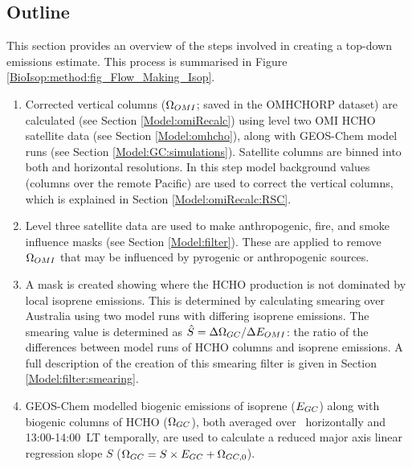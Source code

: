   \subsection{Outline}
    \label{BioIsop:method:outline}
    This section provides an overview of the steps involved in creating a top-down emissions estimate. %
    This process is summarised in Figure \ref{BioIsop:method:fig_Flow_Making_Isop}.
    \begin{enumerate}
      \item 
        Corrected vertical columns ($\Omega_{OMI}$; saved in the OMHCHORP dataset) are calculated (see Section \ref{Model:omiRecalc}) using level two OMI HCHO satellite data (see Section \ref{Model:omhcho}), along with GEOS-Chem model runs (see Section \ref{Model:GC:simulations}).
        Satellite columns are binned into both \highhr and \lowhr horizontal resolutions.
        In this step model background values (columns over the remote Pacific) are used to correct the vertical columns, which is explained in Section \ref{Model:omiRecalc:RSC}.
      \item 
        Level three satellite data are used to make anthropogenic, fire, and smoke influence masks (see Section \ref{Model:filter}).
        These are applied to remove $\Omega_{OMI}$ that may be influenced by pyrogenic or anthropogenic sources. 
      \item
        A mask is created showing where the HCHO production is not dominated by local isoprene emissions. 
        This is determined by calculating smearing over Australia using two model runs with differing isoprene emissions.
        The smearing value is determined as $\hat{S}=\Delta \Omega_{GC}/ \Delta E_{OMI}$: the ratio of the differences between model runs of HCHO columns and isoprene emissions.
        A full description of the creation of this smearing filter is given in Section \ref{Model:filter:smearing}.
      \item 
        GEOS-Chem modelled biogenic emissions of isoprene ($E_{GC}$) along with biogenic columns of HCHO ($\Omega_{GC}$), both averaged over \lowhr ~horizontally and 13:00-14:00~LT temporally, are used to calculate a reduced major axis linear regression slope $S$ ($\Omega_{GC}=S \times E_{GC} + \Omega_{GC,0}$).

\end{enumerate}

